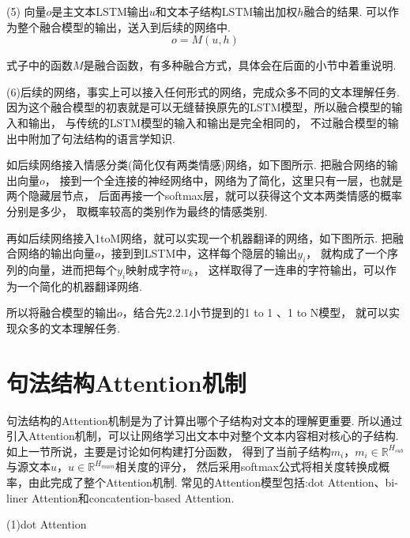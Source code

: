 \documentclass[bachelor,adobefonts]{jnuthesis}
\begin{document}
(5)
向量$o$是主文本LSTM输出$u$和文本子结构LSTM输出加权$h$融合的结果.
可以作为整个融合模型的输出，送入到后续的网络中.
\begin{equation}
  o = M(u,h)
\end{equation}

式子中的函数$M$是融合函数，有多种融合方式，具体会在后面的小节中着重说明.

(6)后续的网络，事实上可以接入任何形式的网络，完成众多不同的文本理解任务.
因为这个融合模型的初衷就是可以无缝替换原先的LSTM模型，所以融合模型的输入和输出，
与传统的LSTM模型的输入和输出是完全相同的，
不过融合模型的输出中附加了句法结构的语言学知识.

如后续网络接入情感分类(简化仅有两类情感)网络，如下图所示.
把融合网络的输出向量$o$，
接到一个全连接的神经网络中，网络为了简化，这里只有一层，也就是两个隐藏层节点，
后面再接一个softmax层，就可以获得这个文本两类情感的概率分别是多少，
取概率较高的类别作为最终的情感类别.

再如后续网络接入1toM网络，就可以实现一个机器翻译的网络，如下图所示.
把融合网络的输出向量$o$，接到到LSTM中，这样每个隐层的输出$y_{i}$，
就构成了一个序列的向量，进而把每个$y_{i}$映射成字符$w_{k}$，
这样取得了一连串的字符输出，可以作为一个简化的机器翻译网络.


所以将融合模型的输出$o$，结合先2.2.1小节提到的1 to 1 、1 to N模型，
就可以实现众多的文本理解任务. 

\section{句法结构Attention机制}
句法结构的Attention机制是为了计算出哪个子结构对文本的理解更重要.
所以通过引入Attention机制，可以让网络学习出文本中对整个文本内容相对核心的子结构.
如上一节所说，主要是讨论如何构建打分函数，
得到了当前子结构$m_{i}$，$m_{i} \in \mathbb{R}^{H_{sub}}$与源文本$u$，$u \in \mathbb{R}^{H_{main}}$相关度的评分，
然后采用softmax公式将相关度转换成概率，由此完成了整个Attention机制.
常见的Attention模型包括:dot Attention、bi-liner Attention和concatention-based Attention.

(1)dot Attention
\end{document}
